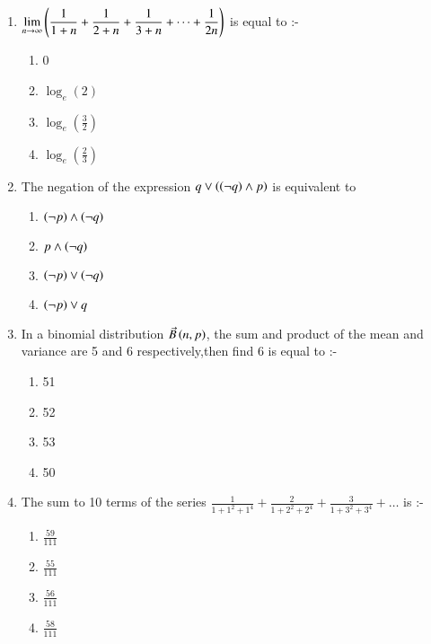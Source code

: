 \documentclass[journal]{IEEEtran}
\begin{document}
\begin{enumerate}
	\item $\displaystyle \lim_{n \to \infty} \left( \frac{1}{1+n} + \frac{1}{2+n} + \frac{1}{3+n} + \dots +\frac{1}{2n} \right)$ is equal to :-
\begin{multicols}{2}
\begin{enumerate}
    \item 0
    \item $\log_e(2)$
    \item $\log_e(\frac{3}{2})$
    \item $\log_e(\frac{2}{3})$
\end{enumerate}
\end{multicols}
\item The negation of the expression $q \vee \left(\left(\neg q\right)\wedge p\right)$ is equivalent to 
\begin{multicols}{2}
\begin{enumerate}
\item $\left(\neg p\right) \wedge \left(\neg q\right)$
\item $p \wedge \left(\neg q\right)$
\item $\left(\neg p\right) \vee \left(\neg q\right)$
\item $\left(\neg p\right) \vee q$
\end{enumerate}
\end{multicols}
\item In a binomial distribution $\Vec{B}\left(n,p\right)$, the sum and product of the mean and variance are 5 and 6 respectively,then find 6 is equal to :-
\begin{multicols}{2}
\begin{enumerate}
    \item 51
    \item 52
    \item 53
    \item 50
\end{enumerate}
\end{multicols}
\item The sum to 10 terms of the series $\frac{1}{1+1^2+1^4}+\frac{2}{1+2^2+2^4}+\frac{3}{1+3^2+3^4}+ \dots$ is :-
\begin{multicols}{2}
\begin{enumerate}
    \item $\frac{59}{111}$
    \item $\frac{55}{111}$
    \item $\frac{56}{111}$
    \item $\frac{58}{111}$
\end{enumerate}

\end{multicols}
\end{enumerate}
\end{document}
